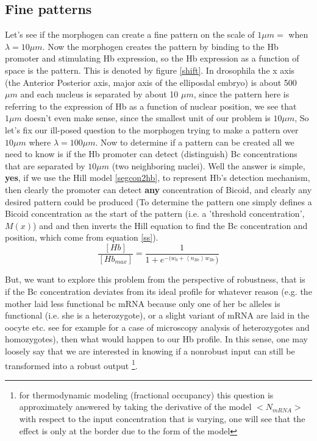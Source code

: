   \subsection{Fine patterns}
   Let's see if the morphogen can create a fine pattern on the scale of $ 1 \mu m = $ when $ \lambda = 10 \mu m$. Now the morphogen creates the pattern by binding to the Hb promoter and stimulating Hb expression, so the Hb expression as a function of space is the pattern.  This is denoted by figure \ref{shift}.  In drosophila the x axis (the Anterior Posterior axis, major axis of the elliposdal embryo) is about 500 $\mu m$ and each nucleus is separated by about 10 $ \mu m$, since the pattern here is referring to the expression of Hb as a function of nuclear position, we see that $ 1 \mu m$ doesn't even make sense, since the smallest unit of our problem is $10 \mu m$,  So let's fix our ill-posed question to the morphogen trying to make a pattern over  $ 10 \mu m $ where $ \lambda =100 \mu m $.  Now to determine if a pattern can be created all we need to know is if the Hb promoter can detect (distinguish) Bc concentrations that are separated by $ 10 \mu m $  (two neighboring nuclei).  Well the answer is simple, \textbf{yes}, if we use the Hill model \eqref{segcon2hb}, to represent Hb's detection mechanism, then clearly the promoter can detect \textbf{any} concentration of Bicoid, and clearly any desired pattern could be produced  (To determine the pattern one simply defines a Bicoid concentration as the start of the pattern (i.e. a 'threshold concentration', $M(x)$) and and then inverts the Hill equation to find the Bc concentration and position, which come from equation \eqref{ss}).
 \begin{equation}\label{segcon2hb}
    \frac{[Hb]}{[Hb_{max}]} = \frac{1}{1 + e^{ -(w_{0} +  \left< n_{Bc} \right> w_{Bc}})}
\end{equation}

 But, we want to explore this problem from the perspective of robustness, that is if the Bc concentration deviates from its ideal profile for whatever reason (e.g. the mother laid less functional bc mRNA because only one of her bc alleles is functional (i.e. she is a heterozygote), or a slight variant of mRNA are laid in the oocyte etc. see for example\cite{pmid18687054} for a case of microscopy analysis of heterozygotes and homozygotes), then what would happen to our Hb profile.  In this sense, one may loosely say that we are interested in knowing if a nonrobust input can still be transformed into a robust output \footnote[2]{for thermodynamic modeling (fractional occupancy) this question is approximately answered by taking the derivative of the model $<N_{mRNA}>$ with respect to the input concentration that is varying, one will see that the effect is only at the border due to the form of the model}.

